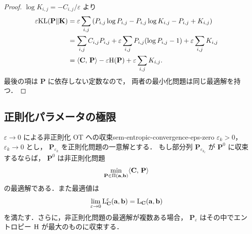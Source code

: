 \begin{proof}
  $\log K_{i,j} = -C_{i,j}/\varepsilon$ より
  \begin{align*}
    \varepsilon \mathrm{KL}(\mathbf{P}\|\mathbf{K})
    &=
    \varepsilon\sum_{i,j}
    \left(
      P_{i,j}\log P_{i,j}
      - P_{i,j}\log K_{i,j}
      - P_{i,j}
      + K_{i,j}
    \right) \\
    &=
    \sum_{i,j} C_{i,j}P_{i,j}
    + \varepsilon\sum_{i,j} P_{i,j}(\log P_{i,j}-1)
    + \varepsilon\sum_{i,j} K_{i,j} \\
    &=
    \langle \mathbf{C},\, \mathbf{P} \rangle - \varepsilon \mathrm{H}(\mathbf{P})
    + \varepsilon\sum_{i,j} K_{i,j}.
  \end{align*}
  最後の項は $\mathbf{P}$ に依存しない定数なので，
  両者の最小化問題は同じ最適解を持つ．
\end{proof}

\subsection{正則化パラメータの極限}
\label{subsec:sem-epsilon-limits}

\begin{theorem}{$\varepsilon \to 0$ による非正則化 OT への収束}{sem-entropic-convergence-eps-zero}
  $\varepsilon_k > 0$，$\varepsilon_k \to 0$ とし，
  $\mathbf{P}_{\varepsilon_k}$ を正則化問題の一意解とする．
  もし部分列 $\mathbf{P}_{\varepsilon_{k_\ell}}$ が
  $\mathbf{P}^0$ に収束するならば，
  $\mathbf{P}^0$ は非正則化問題
  \[
    \min_{\mathbf{P} \in \Pi(\mathbf{a}, \mathbf{b})}
    \langle \mathbf{C},\, \mathbf{P} \rangle
  \]
  の最適解である．また最適値は
  \[
    \lim_{\varepsilon \to 0}
    \mathrm{L}_{\mathbf{C}}^\varepsilon(\mathbf{a},\mathbf{b})
    =
    \mathrm{L}_{\mathbf{C}}(\mathbf{a},\mathbf{b})
  \]
  を満たす．さらに，非正則化問題の最適解が複数ある場合，
  $\mathbf{P}_\varepsilon$ はその中でエントロピー $\mathrm{H}$ が最大のものに収束する．
\end{theorem}

